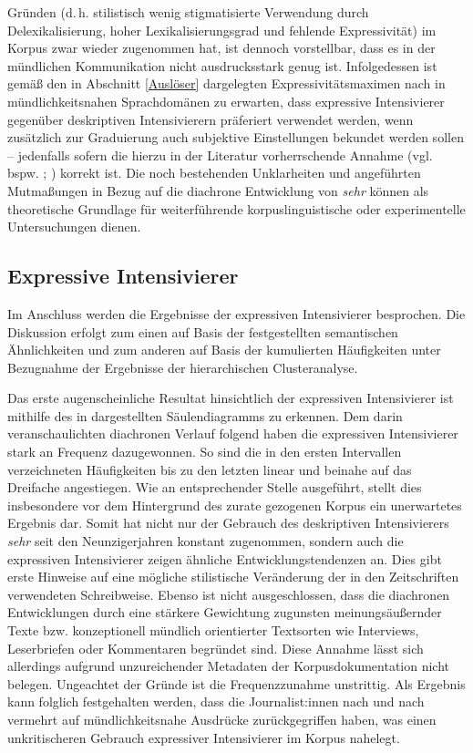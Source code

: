 Gründen (d.\,h. stilistisch wenig stigmatisierte Verwendung durch Delexikalisierung, hoher Lexikalisierungsgrad und fehlende Expressivität) im Korpus zwar wieder zugenommen hat, ist dennoch vorstellbar, dass es in der mündlichen Kommunikation nicht ausdrucksstark genug ist. Infolgedessen ist gemäß den in Abschnitt \ref{Auslöser} dargelegten Expressivitätsmaximen nach \citet[]{Kirschbaum.2002a} in mündlichkeitsnahen Sprachdomänen zu erwarten, dass expressive Intensivierer gegenüber deskriptiven Intensivierern präferiert verwendet werden, wenn zusätzlich zur Graduierung auch subjektive Einstellungen bekundet werden sollen -- jedenfalls sofern die hierzu in der Literatur vorherrschende Annahme (vgl. bspw. \citealt[315]{Lang.1983}; \citealt[57]{Ortner.2014}) korrekt ist. Die noch bestehenden Unklarheiten und angeführten Mutmaßungen in Bezug auf die diachrone Entwicklung von \textit{sehr} können als theoretische Grundlage für weiterführende korpuslinguistische oder experimentelle Untersuchungen dienen.

\subsection{Expressive Intensivierer}

Im Anschluss werden die Ergebnisse der expressiven Intensivierer besprochen. Die Diskussion erfolgt zum einen auf Basis der festgestellten semantischen Ähnlichkeiten und zum anderen auf Basis der kumulierten Häufigkeiten unter Bezugnahme der Ergebnisse der hierarchischen Clusteranalyse.

Das erste augenscheinliche Resultat hinsichtlich der expressiven Intensivierer ist mithilfe des in  dargestellten Säulendiagramms zu erkennen. Dem darin veranschaulichten diachronen Verlauf folgend haben die expressiven Intensivierer stark an Frequenz dazugewonnen. So sind die in den ersten Intervallen verzeichneten Häufigkeiten bis zu den letzten linear und beinahe auf das Dreifache angestiegen. Wie an entsprechender Stelle ausgeführt, stellt dies insbesondere vor dem Hintergrund des zurate gezogenen Korpus ein unerwartetes Ergebnis dar. Somit hat nicht nur der Gebrauch des deskriptiven Intensivierers \textit{sehr} seit den Neunzigerjahren konstant zugenommen, sondern auch die expressiven Intensivierer zeigen ähnliche Entwicklungstendenzen an. Dies gibt erste Hinweise auf eine mögliche stilistische Veränderung der in den Zeitschriften verwendeten Schreibweise. Ebenso ist nicht ausgeschlossen, dass die diachronen Entwicklungen durch eine stärkere Gewichtung zugunsten meinungsäußernder Texte bzw. konzeptionell mündlich orientierter Textsorten wie Interviews, Leserbriefen oder Kommentaren begründet sind. Diese Annahme lässt sich allerdings aufgrund unzureichender Metadaten der Korpusdokumentation nicht belegen. Ungeachtet der Gründe ist die Frequenzzunahme unstrittig. Als Ergebnis kann folglich festgehalten werden, dass die Journalist:innen nach und nach vermehrt auf mündlichkeitsnahe Ausdrücke zurückgegriffen haben, was einen unkritischeren Gebrauch expressiver Intensivierer im Korpus nahelegt.

